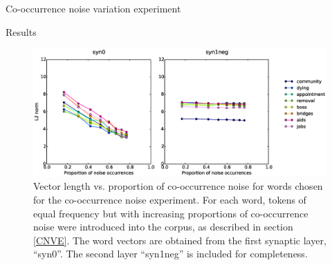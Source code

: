 \documentclass{article} %
\begin{document}
\begin{section}{Co-occurrence noise variation experiment}
\begin{subsection}{Results}
\begin{figure}\label{fig:co-occurrence-noise-graph}
	\includegraphics[scale=0.6]{cooccurrence-noise-graph}
	\caption{
	Vector length vs. proportion of co-occurrence noise for words
	chosen for the co-occurrence noise experiment.  For each word,
	tokens of equal frequency but with increasing proportions of
	co-occurrence noise were introduced into the corpus, as
	described in section \ref{CNVE}.
	The word vectors are obtained from the first synaptic layer, ``syn0''.
	The second layer ``syn1neg'' is included for completeness.
	}
\end{figure}

\end{subsection}

\end{section}
\end{document}
